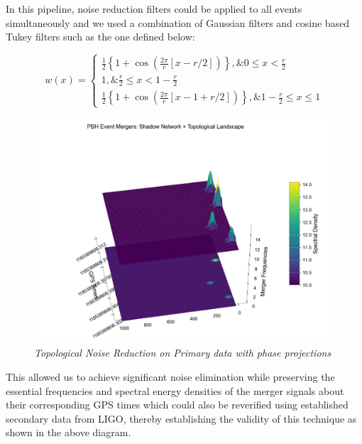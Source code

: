     In this pipeline, noise reduction filters could be applied to all events simultaneously and we used a combination of Gaussian filters and cosine based Tukey filters such as the one defined below:

    \begin{equation}
        w(x)= \begin{cases}\frac{1}{2}\left\{1+\cos \left(\frac{2 \pi}{r}[x-r / 2]\right)\right\}, \& 0 \leq x<\frac{r}{2} \\ 1, \& \frac{r}{2} \leq x<1-\frac{r}{2} \\ \frac{1}{2}\left\{1+\cos \left(\frac{2 \pi}{r}[x-1+r / 2]\right)\right\}, \& 1-\frac{r}{2} \leq x \leq 1\end{cases}
    \end{equation}

    \begin{figure}[H]
        \centering
        \includegraphics[width=1.0\linewidth]{images/49_06_Topological Noise Reduction on Primary data with phase prijections.jpg}
        \caption{\textit{Topological Noise Reduction on Primary data with phase projections}}
        \label{fig:LIGO4_PlaceHolder_fig}
    \end{figure}

    This allowed us to achieve significant noise elimination while preserving the essential frequencies and spectral energy densities of the merger signals about their corresponding GPS times which could also be reverified using established secondary data from LIGO, thereby establishing the validity of this technique as shown in the above diagram.

